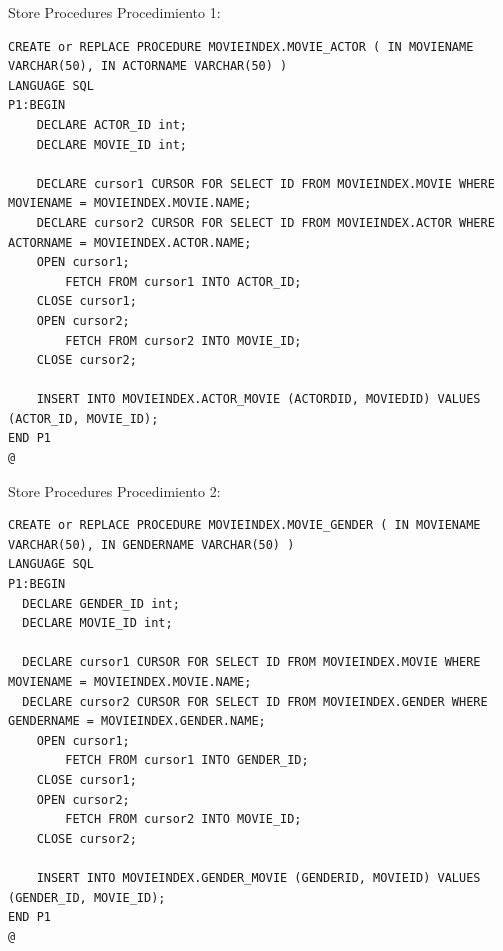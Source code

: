 \documentclass{beamer}%
\begin{document}
\begin{frame}[fragile]{Store Procedures}
Procedimiento 1:
\begin{tiny}
\begin{verbatim}
CREATE or REPLACE PROCEDURE MOVIEINDEX.MOVIE_ACTOR ( IN MOVIENAME VARCHAR(50), IN ACTORNAME VARCHAR(50) )
LANGUAGE SQL
P1:BEGIN
    DECLARE ACTOR_ID int;
    DECLARE MOVIE_ID int;

    DECLARE cursor1 CURSOR FOR SELECT ID FROM MOVIEINDEX.MOVIE WHERE MOVIENAME = MOVIEINDEX.MOVIE.NAME;
    DECLARE cursor2 CURSOR FOR SELECT ID FROM MOVIEINDEX.ACTOR WHERE ACTORNAME = MOVIEINDEX.ACTOR.NAME;
    OPEN cursor1;
        FETCH FROM cursor1 INTO ACTOR_ID;
    CLOSE cursor1;
    OPEN cursor2;
        FETCH FROM cursor2 INTO MOVIE_ID;
    CLOSE cursor2;

    INSERT INTO MOVIEINDEX.ACTOR_MOVIE (ACTORDID, MOVIEDID) VALUES (ACTOR_ID, MOVIE_ID);
END P1
@
\end{verbatim}
\end{tiny}
\end{frame}

\begin{frame}[fragile]{Store Procedures}
Procedimiento 2:
\begin{tiny}
\begin{verbatim}
CREATE or REPLACE PROCEDURE MOVIEINDEX.MOVIE_GENDER ( IN MOVIENAME VARCHAR(50), IN GENDERNAME VARCHAR(50) )
LANGUAGE SQL
P1:BEGIN
  DECLARE GENDER_ID int;
  DECLARE MOVIE_ID int;

  DECLARE cursor1 CURSOR FOR SELECT ID FROM MOVIEINDEX.MOVIE WHERE MOVIENAME = MOVIEINDEX.MOVIE.NAME;
  DECLARE cursor2 CURSOR FOR SELECT ID FROM MOVIEINDEX.GENDER WHERE GENDERNAME = MOVIEINDEX.GENDER.NAME;
    OPEN cursor1;
        FETCH FROM cursor1 INTO GENDER_ID;
    CLOSE cursor1;
    OPEN cursor2;
        FETCH FROM cursor2 INTO MOVIE_ID;
    CLOSE cursor2;

    INSERT INTO MOVIEINDEX.GENDER_MOVIE (GENDERID, MOVIEID) VALUES (GENDER_ID, MOVIE_ID);
END P1
@
\end{verbatim}
\end{tiny}
\end{frame}
\end{document}
